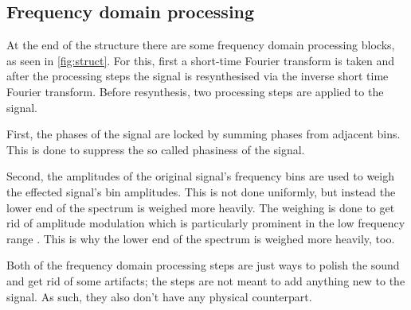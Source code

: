 \subsection{Frequency domain processing}
At the end of the structure there are some frequency domain processing blocks, as seen in \ref{fig:struct}. For this, first a short-time Fourier transform is taken and after the processing steps the signal is resynthesised via the inverse short time Fourier transform. Before resynthesis, two processing steps are applied to the signal.

First, the phases of the signal are locked by summing phases from adjacent bins.\cite{Puckette} This is done to suppress the so called phasiness of the signal.

Second, the amplitudes of the original signal's frequency bins are used to weigh the effected signal's bin amplitudes. This is not done uniformly, but instead the lower end of the spectrum is weighed more heavily. The weighing is done to get rid of amplitude modulation which is particularly prominent in the low frequency range \cite{dudas}. This is why the lower end of the spectrum is weighed more heavily, too.

Both of the frequency domain processing steps are just ways to polish the sound and get rid of some artifacts; the steps are not meant to add anything new to the signal. As such, they also don't have any physical counterpart.
